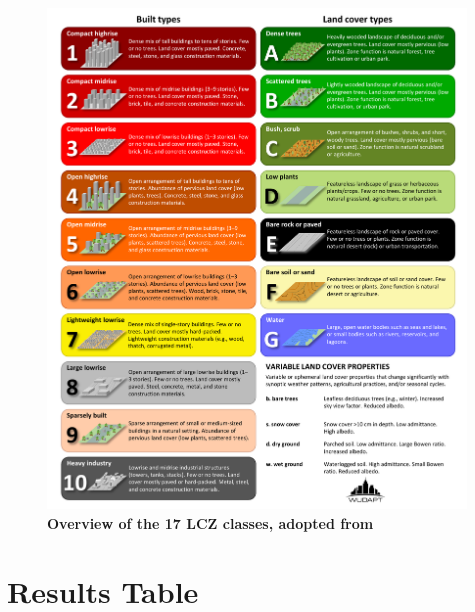 \documentclass[utf8]{frontiersSCNS} %
\begin{document}
\begin{figure}
\centering
\includegraphics[width=0.99\textwidth]{images/image10.pdf}
\caption{\bf Overview of the 17 LCZ classes, adopted from \cite{Demuzere2022Final}}
 \label{fig:17lczs}
\end{figure}

\section{Results Table}\label{sec:appendix2}

\end{document}
